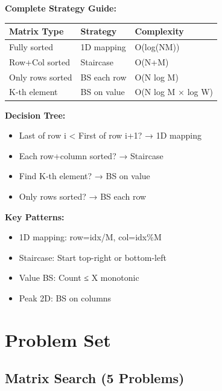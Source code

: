 \documentclass[11pt,a4paper,oneside]{book}
\begin{document}
\begin{tcolorbox}[
    enhanced,breakable,
    colback=primaryblue!10,
    colframe=primaryblue,
    boxrule=2pt,
    arc=4mm,
    title=\textbf{2D Binary Search: Complete Mastery}
]
\textbf{Complete Strategy Guide:}

\begin{center}
\begin{tabular}{|l|l|l|}
\hline
\rowcolor{lightgray}
\textbf{Matrix Type} & \textbf{Strategy} & \textbf{Complexity} \\
\hline
Fully sorted & 1D mapping & O(log(NM)) \\
\hline
Row+Col sorted & Staircase & O(N+M) \\
\hline
Only rows sorted & BS each row & O(N log M) \\
\hline
K-th element & BS on value & O(N log M × log W) \\
\hline
\end{tabular}
\end{center}

\textbf{Decision Tree:}
\begin{itemize}
    \item  Last of row i < First of row i+1? → 1D mapping
    \item  Each row+column sorted? → Staircase
    \item  Find K-th element? → BS on value
    \item  Only rows sorted? → BS each row
\end{itemize}

\textbf{Key Patterns:}
\begin{itemize}
    \item 1D mapping: row=idx/M, col=idx\%M
    \item Staircase: Start top-right or bottom-left
    \item Value BS: Count ≤ X monotonic
    \item Peak 2D: BS on columns
\end{itemize}
\end{tcolorbox}


\section{Problem Set}

\subsection{Matrix Search (5 Problems)}
\end{document}
